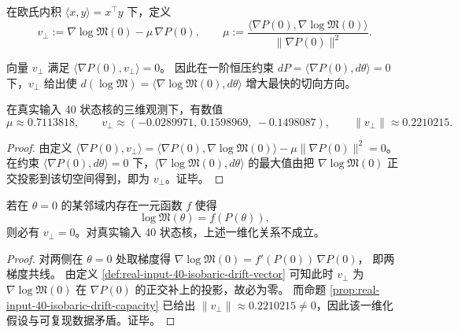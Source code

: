 \begin{definition}[恒压漂移容量向量]\label{def:real-input-40-isobaric-drift-vector}
在欧氏内积 \(\langle x,y\rangle=x^\top y\) 下，定义
\[
v_\perp
:=\nabla\log\mathfrak{M}(0)-\mu\,\nabla P(0),
\qquad
\mu:=\frac{\langle\nabla P(0),\nabla\log\mathfrak{M}(0)\rangle}{\|\nabla P(0)\|^2}.
\]
\end{definition}

\begin{proposition}\label{prop:real-input-40-isobaric-drift-capacity}
向量 \(v_\perp\) 满足 \( \langle\nabla P(0),v_\perp\rangle=0\)。
因此在一阶恒压约束 \(dP=\langle\nabla P(0),d\theta\rangle=0\) 下，\(v_\perp\) 给出使 \(d(\log\mathfrak{M})=\langle\nabla\log\mathfrak{M}(0),d\theta\rangle\) 增大最快的切向方向。
\par
在真实输入 40 状态核的三维观测下，有数值
\[
\mu\approx 0.7113818,\qquad
v_\perp\approx(-0.0289971,\ 0.1598969,\ -0.1498087),
\qquad
\|v_\perp\|\approx 0.2210215.
\]
\end{proposition}
\begin{proof}
由定义 \(\langle\nabla P(0),v_\perp\rangle=\langle\nabla P(0),\nabla\log\mathfrak{M}(0)\rangle-\mu\|\nabla P(0)\|^2=0\)。
在约束 \(\langle\nabla P(0),d\theta\rangle=0\) 下，\(\langle\nabla\log\mathfrak{M}(0),d\theta\rangle\) 的最大值由把 \(\nabla\log\mathfrak{M}(0)\) 正交投影到该切空间得到，即为 \(v_\perp\)。证毕。
\end{proof}

\begin{corollary}\label{cor:real-input-40-logM-not-just-P}
若在 \(\theta=0\) 的某邻域内存在一元函数 \(f\) 使得
\[
\log\mathfrak{M}(\theta)=f(P(\theta)),
\]
则必有 \(v_\perp=0\)。对真实输入 40 状态核，上述一维化关系不成立。
\end{corollary}
\begin{proof}
对两侧在 \(\theta=0\) 处取梯度得
\(
\nabla\log\mathfrak{M}(0)=f'(P(0))\,\nabla P(0)
\)，
即两梯度共线。
由定义 \ref{def:real-input-40-isobaric-drift-vector} 可知此时 \(v_\perp\) 为 \(\nabla\log\mathfrak{M}(0)\) 在 \(\nabla P(0)\) 的正交补上的投影，故必为零。
而命题 \ref{prop:real-input-40-isobaric-drift-capacity} 已给出 \(\|v_\perp\|\approx 0.2210215\neq 0\)，因此该一维化假设与可复现数据矛盾。证毕。
\end{proof}

